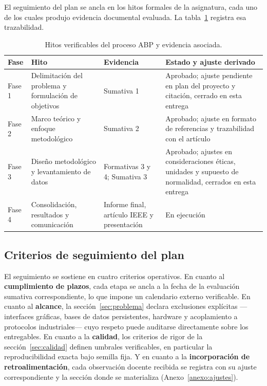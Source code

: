 El seguimiento del plan se ancla en los hitos formales de la asignatura, cada
uno de los cuales produjo evidencia documental evaluada. La
tabla~\ref{tab:hitos} registra esa trazabilidad.

\begin{table}[H]
\centering
\caption{Hitos verificables del proceso ABP y evidencia asociada.}
\label{tab:hitos}
\footnotesize
\begin{tabular}{@{}p{1.7cm}p{4.0cm}p{3.4cm}p{4.2cm}@{}}
\toprule
\textbf{Fase} & \textbf{Hito} & \textbf{Evidencia} & \textbf{Estado y ajuste
derivado}\\
\midrule
Fase 1 & Delimitación del problema y formulación de objetivos &
Sumativa 1 &
Aprobado; ajuste pendiente en plan del proyecto y citación, cerrado en esta
entrega\\
\addlinespace
Fase 2 & Marco teórico y enfoque metodológico &
Sumativa 2 &
Aprobado; ajuste en formato de referencias y trazabilidad con el artículo\\
\addlinespace
Fase 3 & Diseño metodológico y levantamiento de datos &
Formativas 3 y 4; Sumativa 3 &
Aprobado; ajustes en consideraciones éticas, unidades y supuesto de
normalidad, cerrados en esta entrega\\
\addlinespace
Fase 4 & Consolidación, resultados y comunicación &
Informe final, artículo IEEE y presentación &
En ejecución\\
\bottomrule
\end{tabular}
\end{table}

\subsection{Criterios de seguimiento del plan}

El seguimiento se sostiene en cuatro criterios operativos. En cuanto al
\textbf{cumplimiento de plazos}, cada etapa se ancla a la fecha de la evaluación
sumativa correspondiente, lo que impone un calendario externo verificable. En
cuanto al \textbf{alcance}, la sección~\ref{sec:problema} declara exclusiones
explícitas —interfaces gráficas, bases de datos persistentes, hardware y
acoplamiento a protocolos industriales— cuyo respeto puede auditarse
directamente sobre los entregables. En cuanto a la \textbf{calidad}, los
criterios de rigor de la sección~\ref{sec:calidad} definen umbrales
verificables, en particular la reproducibilidad exacta bajo semilla fija. Y en
cuanto a la \textbf{incorporación de retroalimentación}, cada observación
docente recibida se registra con su ajuste correspondiente y la sección donde se
materializa (Anexo~\ref{anexo:ajustes}).

